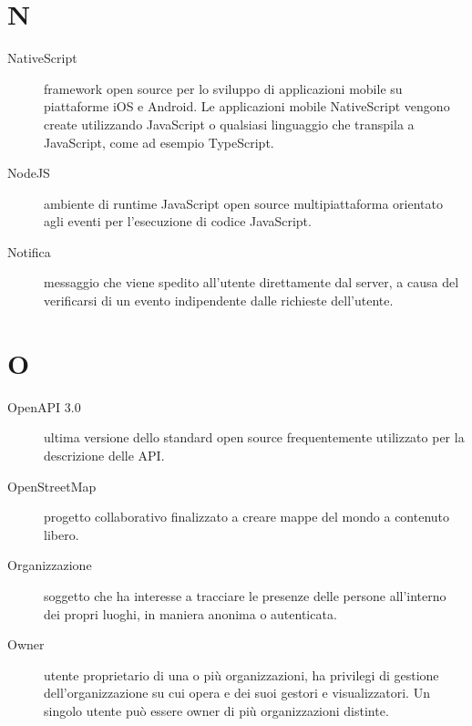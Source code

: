 \documentclass{article}
\begin{document}
\section{N}
\begin{description}
  \item[NativeScript] framework open source per lo sviluppo di applicazioni mobile su piattaforme iOS e Android. Le applicazioni mobile NativeScript vengono create utilizzando JavaScript o qualsiasi linguaggio che transpila a JavaScript, come ad esempio TypeScript.
  \item[NodeJS] ambiente di runtime JavaScript open source multipiattaforma orientato agli eventi per l'esecuzione di codice JavaScript.
  \item[Notifica] messaggio che viene spedito all'utente direttamente dal server, a causa del verificarsi di un evento indipendente dalle richieste dell'utente.
\end{description}
\newpage
\section{O}
\begin{description}
  \item[OpenAPI 3.0] ultima versione dello standard open source frequentemente utilizzato per la descrizione delle API\@.
  \item[OpenStreetMap] progetto collaborativo finalizzato a creare mappe del mondo a contenuto libero.
  \item[Organizzazione] soggetto che ha interesse a tracciare le presenze delle persone all'interno dei propri luoghi, in maniera anonima o autenticata.
  \item[Owner] utente proprietario di una o più organizzazioni, ha privilegi di gestione dell'organizzazione su cui opera e dei suoi gestori e visualizzatori. Un singolo utente può essere owner di più organizzazioni distinte.
\end{description}
\newpage
\end{document}
